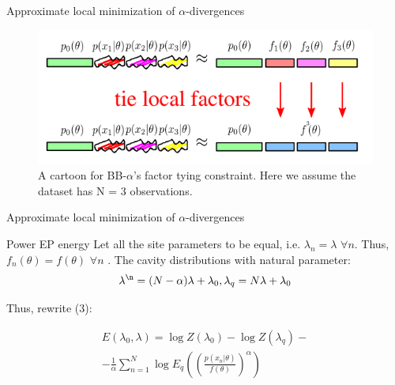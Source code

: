\documentclass{beamer}
\begin{document}
\begin{frame}{Approximate local minimization of
$\alpha$-divergences}
\centering
\begin{figure}
        \centering
        \includegraphics[scale=0.62]{images/div_bmm_6.png}
        \caption{A cartoon for BB-$\alpha$’s factor tying constraint. Here we assume the dataset has N = 3 observations. }
        \label{fig:enter-label}
    \end{figure}
 
\end{frame}

\begin{frame}{Approximate local minimization of
$\alpha$-divergences}
\centering
\begin{block}{Power EP energy}
Let all the site parameters to be equal, i.e. $\lambda_n = \lambda$ $\forall n$. Thus, $f_n(\theta) = f(\theta)$ $\forall n$ . The cavity distributions with natural parameter:$$ \lambda^{\n} = (N - \alpha)\lambda + \lambda_0, \lambda_q = N\lambda + \lambda_0$$ 

Thus, rewrite (3):

\begin{equation}
\begin{split}
    E(\lambda_0,\lambda) = \log Z(\lambda_0) - \log Z(\lambda_q) - 
    \\ - \frac{1}{\alpha} \sum_{n=1}^N \log E_q \left(\left(\frac{p(x_n|\theta)}{f(\theta)}\right)^{\alpha}\right)
\end{split}
\end{equation}
\end{block}
 
\end{frame}
\end{document}
